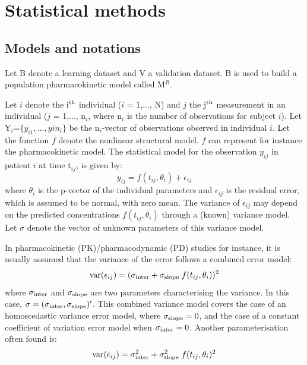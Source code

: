 \section{Statistical methods} \label{sec:npde}

\subsection{Models and notations}

\hskip 18pt Let B denote a learning dataset and V a validation dataset. B is used to build a population pharmacokinetic model called M$^B$.

Let $i$ denote the i$^{\rm th}$ individual ($i$ = 1,..., N) and $j$ the j$^{\rm th}$ measurement in an individual 
($j$ = 1,..., n$_i$, where n$_i$ is the number of observations for subject $i$). Let Y$_i$=$\{y_{i1},...,y{in_i} 
\}$ be the n$_i$-vector of observations observed in individual $i$. Let the function $f$ denote the nonlinear 
structural model. $f$ can represent for instance the pharmacokinetic model. The statistical model for the 
observation $y_{ij}$ in patient $i$ at time t$_{ij}$, is given by: 
\begin{equation} 
y_{ij}=f(t_{ij},\theta_i)+\epsilon_{ij} 
\end{equation} 
where $\theta_i$ is the p-vector of the individual 
parameters and $\epsilon_{ij}$ is the residual error, which is assumed to be normal, with zero mean. The variance 
of $\epsilon_{ij}$ may depend on the predicted concentrations $f(t_{ij},\theta_i)$ through a (known) variance 
model. Let $\sigma$ denote the vector of unknown parameters of this variance model.

In pharmacokinetic (PK)/pharmacodynamic (PD) studies for instance, it is usually assumed that the variance of the 
error follows a combined error model: 
\begin{equation} 
\var(\epsilon_{ij})= (\sigma_{\rm inter} + \sigma_{\rm slope} \; f(t_{ij},\theta_i))^2 \label{eq:errormod} 
\end{equation} 
where $\sigma_{\rm inter}$ and $\sigma_{\rm 
slope}$ are two parameters characterising the variance. In this case, $\sigma=(\sigma_{\rm inter},\sigma_{\rm 
slope})'$. This combined variance model covers the case of an homoscedastic variance error model, where 
$\sigma_{\rm slope}=0$, and the case of a constant coefficient of variation error model when $\sigma_{\rm 
inter}=0$. Another parameterisation often found is: 
\begin{equation} 
\hbox{var}(\epsilon_{ij})= \sigma_{\rm inter}^2 +  \sigma_{\rm slope}^2 \; f(t_{ij},\theta_i)^2 
\end{equation}

